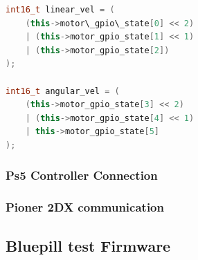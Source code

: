 \documentclass[../../../monografia.tex]{subfiles}
\begin{document}
\begin{lstlisting}[language=C++, caption={BluepillCommunication::loop() function}]
int16_t linear_vel = (
    (this->motor\_gpio\_state[0] << 2)
    | (this->motor_gpio_state[1] << 1)
    | (this->motor_gpio_state[2])
);

int16_t angular_vel = (
    (this->motor_gpio_state[3] << 2) 
    | (this->motor_gpio_state[4] << 1) 
    | this->motor_gpio_state[5]
);
\end{lstlisting}

\subsubsection{Ps5 Controller Connection}

\subsubsection{Pioner 2DX communication}

\subsection{Bluepill test Firmware}
\end{document}
